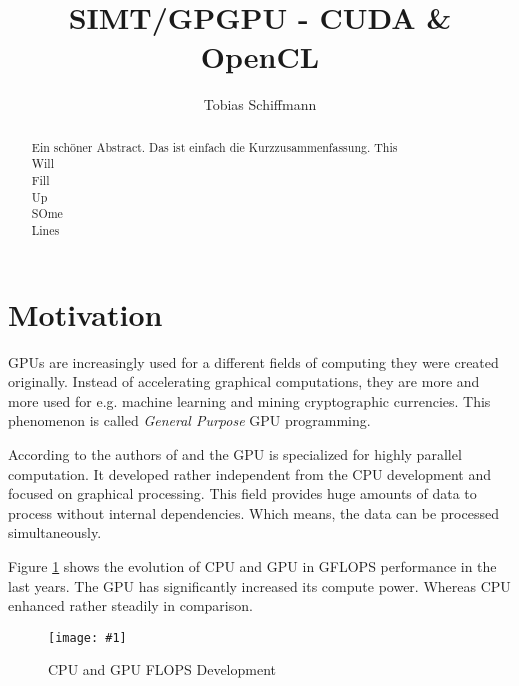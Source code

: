 \documentclass[a4paper,12pt]{llncs}
\numberwithin{equation}{section}
\newcommand{\bildbreite}[5]{
  \begin{figure}[htbp]
    \begin{center}
      \texttt{[image: \#1]}
      \caption[#5]{#4}
      \label{#3}
    \end{center}
  \end{figure}
}
\begin{document}


\author{Tobias Schiffmann}

\title{SIMT/GPGPU - CUDA \& OpenCL}

\maketitle

\thispagestyle{empty}

\begin{abstract}
Ein schöner Abstract. Das ist einfach die Kurzzusammenfassung.
This \\
Will\\
Fill\\
Up\\
SOme\\
Lines\\
\end{abstract}


\section{Motivation}
  GPUs are increasingly used for a different fields of computing they were created originally.
  Instead of accelerating graphical computations, they are more and more used for e.g. machine learning and mining cryptographic currencies.
  This phenomenon is called \textit{General Purpose} GPU programming.~\cite{8363085}~\cite{Huang.2008}
  
    According to the authors of \cite{NVIDIA.2019} and \cite{Rauber.2012} the GPU is specialized for highly parallel computation.
    It developed rather independent from the CPU development and focused on graphical processing.
    This field provides huge amounts of data to process without internal dependencies.
    Which means, the data can be processed simultaneously.
     
    Figure \ref{fig:GPU_CPU} shows the evolution of CPU and GPU in GFLOPS performance in the last years.
  The GPU has significantly increased its compute power.
  Whereas CPU enhanced rather steadily in comparison.
   \bildbreite{figures/GPU_CPU_Flops.JPG}{14cm}{fig:GPU_CPU}{CPU and GPU FLOPS Development~\cite{NVIDIA.2019}}{}
  
\end{document}
